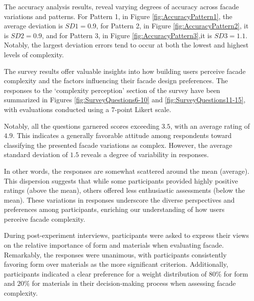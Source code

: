 The accuracy analysis results, reveal varying degrees of accuracy across facade variations and patterns.
For Pattern 1, in Figure \ref{fig:AccuracyPattern1}, the average deviation is \(SD1 = 0.9\), for Pattern 2, in Figure \ref{fig:AccuracyPattern2}, it is \(SD2 = 0.9\), and for Pattern 3, in Figure \ref{fig:AccuracyPattern3},it is \(SD3 = 1.1\).
Notably, the largest deviation errors tend to occur at both the lowest and highest levels of complexity.



The survey results offer valuable insights into how building users perceive facade complexity and the factors influencing their facade design preferences.
The responses to the `complexity perception' section of the survey have been summarized in Figures \ref{fig:SurveyQuestions6-10} and \ref{fig:SurveyQuestions11-15}, with evaluations conducted using a 7-point Likert scale.


Notably, all the questions garnered scores exceeding \(3.5\), with an average rating of \(4.9\).
This indicates a generally favorable attitude among respondents toward classifying the presented facade variations as complex.
However, the average standard deviation of \(1.5\) reveals a degree of variability in responses.

In other words, the responses are somewhat scattered around the mean (average).
This dispersion suggests that while some participants provided highly positive ratings (above the mean), others offered less enthusiastic assessments (below the mean).
These variations in responses underscore the diverse perspectives and preferences among participants, enriching our understanding of how users perceive facade complexity.






During post-experiment interviews, participants were asked to express their views on the relative importance of form and materials when evaluating facade.
Remarkably, the responses were unanimous, with participants consistently favoring form over materials as the more significant criterion.
Additionally, participants indicated a clear preference for a weight distribution of \(80\%\) for form and \(20\%\) for materials in their decision-making process when assessing facade complexity.

